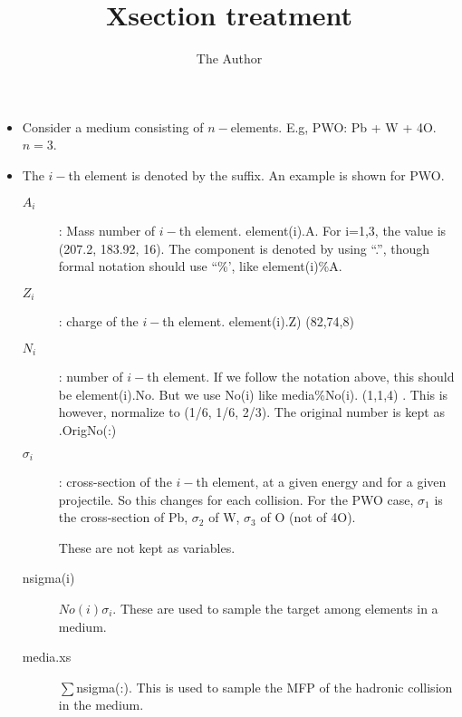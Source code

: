 \documentclass[a4paper]{jarticle}
\title{Xsection treatment}
\author{The Author}
\begin{document}
 \maketitle
 \begin{itemize}
  \item  Consider a medium consisting of  $n-$elements.  E.g, PWO:
	   Pb + W + 4O.  $n=3$.  
  \item The $i-$th element is denoted by the suffix.
	  An example is shown for PWO.   
	
	\begin{description}
	 \item[$A_i$]:  Mass number of $i-$th element.
		    element(i).A. For i=1,3, the value is    (207.2, 183.92, 16).
		    The component is denoted by using ``.'',
		    though  formal notation should use ``\%', like
		    element(i)\%A.
	 	 \item[$Z_i$]:  charge of the $i-$th element.
	 element(i).Z)	    (82,74,8)
	 \item[$N_i$]:  number of $i-$th element.
If we follow the notation above, this should be
		    element(i).No. But we use  No(i) like media\%No(i).
		    (1,1,4) .    This is however,
		    normalize to (1/6, 1/6, 2/3).  The original number
		    is kept as .OrigNo(:)
	 \item[$\sigma_i$]:  cross-section of  the $i-$th element,
		    at a given energy and for a given projectile.  So this
		    changes for each collision.
                    For the PWO case,  $\sigma_1$ is the cross-section
		    of
		    Pb, $\sigma_2$  of W, $\sigma_3$ of O (not  of  4O).

		    These are not kept as variables.
		    
	 \item[nsigma(i)]    $No(i) \sigma_i $.  These
		    are
		    used to sample the target among elements in a
		    medium.
	 \item[media.xs ] $\sum $nsigma(:).  This is used to
		    sample the  MFP of the hadronic  collision  in the medium. 

	\end{description}
	

    	
 \end{itemize}
\end{document}
